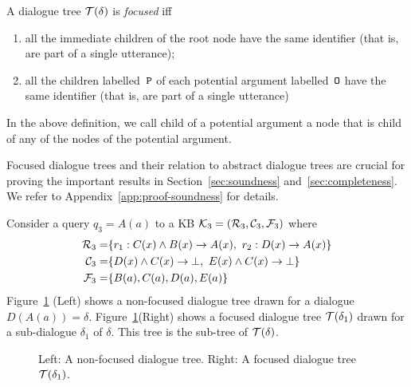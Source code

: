 \begin{definition} 
\label{def:t-focused}
A dialogue tree $\mathcal{T}(\delta)$ is \emph{focused} iff
\begin{enumerate}
    \item all the immediate children of the root node have the same identifier (that is, are part of a single utterance);
    
    \item all the children labelled~$\texttt{\textup{P}}$ of each potential argument labelled~$\texttt{\textup{O}}$
        have the same identifier (that is, are part of a single utterance)
\end{enumerate}
\end{definition}


In the above definition, we call child of a potential argument a node that
is child of any of the nodes of the potential argument.

\begin{remark}
Focused dialogue trees and their relation to abstract dialogue trees are crucial for proving the important results in Section~\ref{sec:soundness} and~\ref{sec:completeness}. We refer to Appendix~\ref{app:proof-soundness} for details.    
\end{remark}

\begin{example} Consider a query $q_3 = A(a) $ to a KB $\mathcal{K}_3 = (\mathcal{R}_3, \mathcal{C}_3, \mathcal{F}_3)$ where 
\begin{align*}
    \mathcal{R}_3 = & \{r_1: C(x) \land B(x) \rightarrow A(x),\ r_2: D(x) \rightarrow A(x) \} \\
    \mathcal{C}_3 = & \{ D(x) \land C(x) \rightarrow \bot ,\ E(x) \land C(x) \rightarrow \bot \} \\
    \mathcal{F}_3 = & \{B(a) , C(a), D(a), E(a) \}
\end{align*}
  Figure~\ref{fig:non-foc-tree} (Left) shows a non-focused dialogue tree drawn for a dialogue $D(A(a)) = \delta$.  Figure~\ref{fig:non-foc-tree}(Right) shows a focused dialogue tree $\mathcal{T}(\delta_1)$ drawn for a sub-dialogue $\delta_1$ of $\delta$. This tree is the sub-tree of $\mathcal{T}(\delta)$.
\end{example}

\begin{figure}
\centering
{}
\caption{
Left: A non-focused dialogue tree.
Right: A focused dialogue tree $\mathcal{T}(\delta_1)$.
}
\label{fig:non-foc-tree}
\end{figure}





















